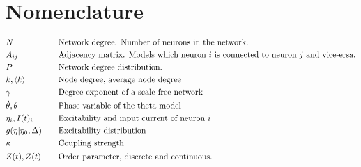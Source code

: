 \newpage
\section{Nomenclature}
\begin{alignat*}{2}
& N &&\text{Network degree. Number of neurons in the network.}\\
&A_{ij} &&\text{Adjacency matrix. Models which neuron $i$ is connected to neuron $j$ and vice-ersa.}\\
& P &&\text{Network degree distribution.}\\
& k, {\langle k\rangle} &&\text{Node degree, average node degree}\\
&\gamma &&\text{Degree exponent of a scale-free network}\\
&{\dot{\theta}}, \theta &&\text{Phase variable of the theta model}\\
&\eta_i, I(t)_i &&\text{Excitability and input current of neuron $i$}\\
&g(\eta \rvert \eta_0, \Delta) \quad &&\text{Excitability distribution}\\
&\kappa &&\text{Coupling strength}\\
& Z(t), \bar{Z}(t) &&\text{Order parameter, discrete and continuous.}\\
\end{alignat*}
